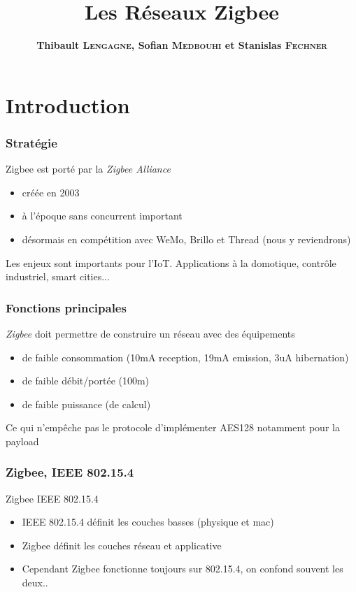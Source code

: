 \documentclass{beamer}
\title[Les Réseaux Zigbee]{Les Réseaux Zigbee}
\author{\textbf{Thibault \textsc{Lengagne}, Sofian \textsc{Medbouhi} et Stanislas \textsc{Fechner}}}
\institute{Centrale Supélec - Campus de Rennes}
\begin{document}
  \begin{frame}
    \titlepage
  \end{frame}
  

\section{Introduction}

  \begin{frame}
     \frametitle{Stratégie}
	 \begin{block}{Zigbee est porté par la \textit{Zigbee Alliance}}
	    \begin{itemize}
		    \item créée en 2003
		    \item à l'époque sans concurrent important
		    \item désormais en compétition avec WeMo, Brillo et Thread (nous y reviendrons)
	    \end{itemize}
	    Les enjeux sont importants pour l'IoT. Applications à la domotique, contrôle industriel, smart cities...
	\end{block}
  \end{frame}

\begin{frame}
   \frametitle{Fonctions principales}

   \begin{block}{\textit{Zigbee} doit permettre de construire un réseau avec des équipements}
   \begin{itemize}
    \item de faible consommation (10mA reception, 19mA emission, 3uA hibernation)
    \item de faible débit/portée (100m)
    \item de faible puissance (de calcul)
   \end{itemize}
   Ce qui n'empêche pas le protocole d'implémenter AES128 notamment pour la payload
	\end{block}
  \end{frame}

    \begin{frame}
   \frametitle{Zigbee, IEEE 802.15.4}
   \begin{block}{Zigbee IEEE 802.15.4}
   \begin{itemize}
	   \item IEEE 802.15.4 définit les couches basses (physique et mac)
	   \item Zigbee définit les couches réseau et applicative
	   \item Cependant Zigbee fonctionne toujours sur 802.15.4, on confond souvent les deux..
   \end{itemize}
   \end{block}
  \end{frame}
\end{document}
